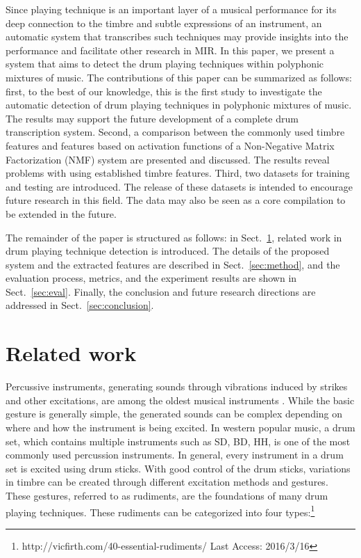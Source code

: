 \documentclass{article}
\begin{document}
Since playing technique is an important layer of a musical performance for its deep connection to the timbre and subtle expressions of an instrument, an automatic system that transcribes such techniques may provide insights into the performance and facilitate other research in MIR. In this paper, we present a system that aims to detect the drum playing techniques within polyphonic mixtures of music. 
The contributions of this paper can be summarized as follows: first, to the best of our knowledge, this is the first study to investigate the automatic detection of drum playing techniques in polyphonic mixtures of music. The results may support the future development of a complete drum transcription system. Second, a comparison between the commonly used timbre features and features based on activation functions of a Non-Negative Matrix Factorization (NMF) system are presented and discussed. The results reveal problems with using established timbre features. Third, two datasets for training and testing are introduced. The release of these datasets is intended to encourage future research in this field. The data may also be seen as a core compilation to be extended in the future.

The remainder of the paper is structured as follows: in Sect.~\ref{sec:related_work}, related work in drum playing technique detection is introduced. The details of the proposed system and the extracted features are described in Sect.~\ref{sec:method}, and the evaluation process, metrics, and the experiment results are shown in Sect.~\ref{sec:eval}. Finally, the conclusion and future research directions are addressed in Sect.~\ref{sec:conclusion}. 


%
\section{Related work}\label{sec:related_work}
Percussive instruments, generating sounds through vibrations induced by strikes and other excitations, are among the oldest musical instruments \cite{Rossing2001}. While the basic gesture is generally simple, the generated sounds can be complex depending on where and how the instrument is being excited. In western popular music, a drum set, which contains multiple instruments such as SD, BD, HH, is one of the most commonly used percussion instruments. In general, every instrument in a drum set is excited using drum sticks. With good control of the drum sticks, variations in timbre can be created through different excitation methods and gestures\cite{Stone2009}. These gestures, referred to as rudiments, are the foundations of many drum playing techniques. These rudiments can be categorized into four types:\footnote{http://vicfirth.com/40-essential-rudiments/ Last Access: 2016/3/16}
\end{document}
